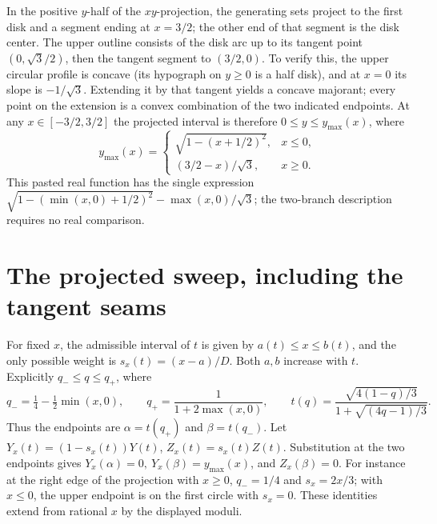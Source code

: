 \documentclass[11pt,letterpaper]{article}
\newcommand{\sect}[1]{\section[#1]{\color{ink}#1}}
\newcommand{\subt}[1]{\par\medskip\noindent{\color{sea}\bfseries #1}\enspace}
\begin{document}
\subt{Why the rulings cover the boundary.}
In the positive \(y\)-half of the \(xy\)-projection, the generating sets project to the first disk and a segment ending at \(x=3/2\); the other end of that segment is the disk center. The upper outline consists of the disk arc up to its tangent point \((0,\sqrt3/2)\), then the tangent segment to \((3/2,0)\). To verify this, the upper circular profile is concave (its hypograph on \(y\ge0\) is a half disk), and at \(x=0\) its slope is \(-1/\sqrt3\). Extending it by that tangent yields a concave majorant; every point on the extension is a convex combination of the two indicated endpoints. At any \(x\in[-3/2,3/2]\) the projected interval is therefore \(0\le y\le y_{\max}(x)\), where
\[
 y_{\max}(x)=
 \begin{cases}\sqrt{1-(x+1/2)^2},&x\le0,\\
 (3/2-x)/\sqrt3,&x\ge0.\end{cases}
\]
This pasted real function has the single expression
\(\sqrt{1-(\min(x,0)+1/2)^2}-\max(x,0)/\sqrt3\); the two-branch description requires no real comparison.

\newpage
\sect{The projected sweep, including the tangent seams}\label{sec:sweep}
For fixed \(x\), the admissible interval of \(t\) is given by \(a(t)\le x\le b(t)\), and the only possible weight is \(s_x(t)=(x-a)/D\). Both \(a,b\) increase with \(t\). Explicitly \(q_-\le q\le q_+\), where
\[
 q_-=\tfrac14-\tfrac12\min(x,0),\qquad
 q_+=\frac1{1+2\max(x,0)},\qquad
 t(q)=\frac{\sqrt{4(1-q)/3}}{1+\sqrt{(4q-1)/3}} .
\]
Thus the endpoints are \(\alpha=t(q_+)\) and \(\beta=t(q_-)\). Let \(Y_x(t)=(1-s_x(t))Y(t)\), \(Z_x(t)=s_x(t)Z(t)\). Substitution at the two endpoints gives \(Y_x(\alpha)=0,\ Y_x(\beta)=y_{\max}(x)\), and \(Z_x(\beta)=0\). For instance at the right edge of the projection with \(x\ge0\), \(q_-=1/4\) and \(s_x=2x/3\); with \(x\le0\), the upper endpoint is on the first circle with \(s_x=0\). These identities extend from rational \(x\) by the displayed moduli.
\end{document}
